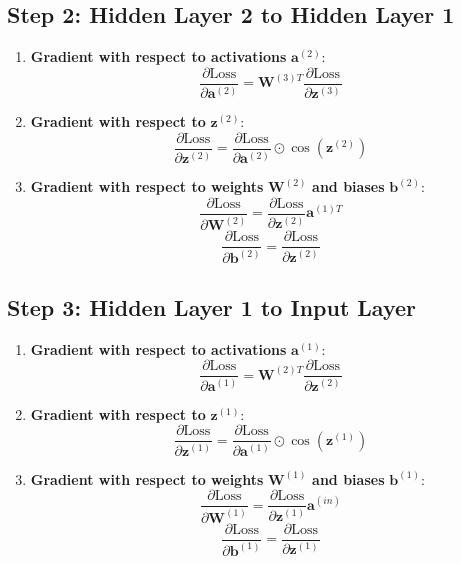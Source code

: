 \documentclass{article}
\begin{document}
\subsection*{Step 2: Hidden Layer 2 to Hidden Layer 1}
\begin{enumerate}
  \item \textbf{Gradient with respect to activations} $\mathbf{a}^{(2)}$:
  \[
  \frac{\partial \text{Loss}}{\partial \mathbf{a}^{(2)}} = \mathbf{W}^{(3)T} \frac{\partial \text{Loss}}{\partial \mathbf{z}^{(3)}}
  \]

  \item \textbf{Gradient with respect to} $\mathbf{z}^{(2)}$:
  \[
  \frac{\partial \text{Loss}}{\partial \mathbf{z}^{(2)}} = \frac{\partial \text{Loss}}{\partial \mathbf{a}^{(2)}} \odot \cos(\mathbf{z}^{(2)})
  \]

  \item \textbf{Gradient with respect to weights} $\mathbf{W}^{(2)}$ \textbf{and biases} $\mathbf{b}^{(2)}$:
  \[
  \frac{\partial \text{Loss}}{\partial \mathbf{W}^{(2)}} = \frac{\partial \text{Loss}}{\partial \mathbf{z}^{(2)}} \mathbf{a}^{(1)T}
  \]
  \[
  \frac{\partial \text{Loss}}{\partial \mathbf{b}^{(2)}} = \frac{\partial \text{Loss}}{\partial \mathbf{z}^{(2)}}
  \]
\end{enumerate}

\subsection*{Step 3: Hidden Layer 1 to Input Layer}
\begin{enumerate}
  \item \textbf{Gradient with respect to activations} $\mathbf{a}^{(1)}$:
  \[
  \frac{\partial \text{Loss}}{\partial \mathbf{a}^{(1)}} = \mathbf{W}^{(2)T} \frac{\partial \text{Loss}}{\partial \mathbf{z}^{(2)}}
  \]

  \item \textbf{Gradient with respect to} $\mathbf{z}^{(1)}$:
  \[
  \frac{\partial \text{Loss}}{\partial \mathbf{z}^{(1)}} = \frac{\partial \text{Loss}}{\partial \mathbf{a}^{(1)}} \odot \cos(\mathbf{z}^{(1)})
  \]

  \item \textbf{Gradient with respect to weights} $\mathbf{W}^{(1)}$ \textbf{and biases} $\mathbf{b}^{(1)}$:
  \[
  \frac{\partial \text{Loss}}{\partial \mathbf{W}^{(1)}} = \frac{\partial \text{Loss}}{\partial \mathbf{z}^{(1)}} \mathbf{a}^{(in)}
  \]
  \[
  \frac{\partial \text{Loss}}{\partial \mathbf{b}^{(1)}} = \frac{\partial \text{Loss}}{\partial \mathbf{z}^{(1)}}
  \]
\end{enumerate}
\end{document}
